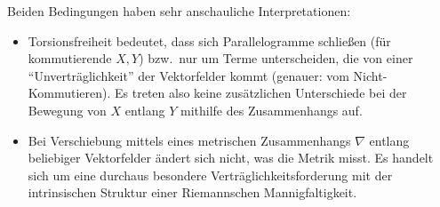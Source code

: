 \documentclass[../H_Analysis_main.tex]{subfiles}
\begin{document}
Beiden Bedingungen haben sehr anschauliche Interpretationen:
\begin{itemize}
\item Torsionsfreiheit bedeutet, dass sich Parallelogramme schließen (für kommutierende $X, Y$) bzw.~nur um Terme unterscheiden, die von einer \enquote{Unverträglichkeit} der Vektorfelder kommt (genauer: vom Nicht-Kommutieren). Es treten also keine zusätzlichen Unterschiede bei der Bewegung von $X$ entlang $Y$ mithilfe des Zusammenhangs auf.%

\item Bei Verschiebung mittels eines metrischen Zusammenhangs $\nabla$ entlang beliebiger Vektorfelder ändert sich nicht, was die Metrik misst. Es handelt sich um eine durchaus besondere Verträglichkeitsforderung mit der intrinsischen Struktur einer Riemannschen Mannigfaltigkeit.
\end{itemize}

\end{document}
